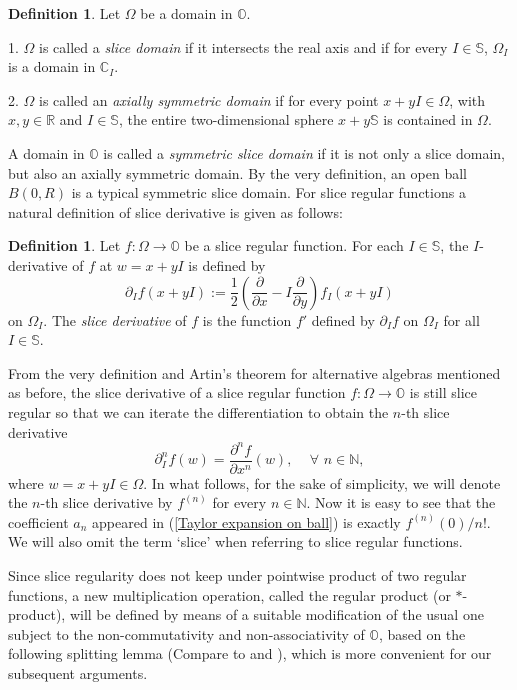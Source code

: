 \documentclass{amsart}
\theoremstyle{definition}
\newtheorem{definition}[theorem]{Definition}
\theoremstyle{remark}
\numberwithin{equation}{section}
\begin{document}
\begin{definition} \label{de: domain}
Let $\Omega$ be a domain in $\mathbb O $.

1. $\Omega$ is called a \textit{slice domain}  if it intersects the real axis and if  for every $I \in \mathbb S $, $\Omega_I$  is a domain in $ \mathbb C_I $.

2. $\Omega$ is called an \textit{axially symmetric domain} if for every point  $x + yI \in \Omega$, with  $x,y \in \mathbb R $ and $I\in \mathbb S$, the entire two-dimensional sphere $x + y\mathbb S$ is contained in $\Omega $.
\end{definition}

A domain in $\mathbb O$ is called a \textit{symmetric slice domain} if it is not only a slice domain, but also an axially symmetric domain. By the very definition, an open ball $B(0,R)$ is  a typical  symmetric slice domain.  For slice regular functions a natural definition of slice derivative is given as follows:
\begin{definition} \label{de: derivative}
Let $f :\Omega \rightarrow \mathbb O$  be a slice regular function. For each $I\in\mathbb S$, the $I$- derivative of $f$ at $w=x+yI$
is defined by
$$\partial_I f(x+yI):=\frac{1}{2}\left(\frac{\partial}{\partial x}-I\frac{\partial}{\partial y}\right)f_I (x+yI)$$
on $\Omega_I$. The \textit{slice derivative} of $f$ is the function $f'$ defined by $\partial_I f$ on $\Omega_I$ for all $I\in\mathbb S$.
 \end{definition}

From the very definition and  Artin's theorem for alternative algebras mentioned as before, the slice derivative of a slice regular function $f:\Omega \rightarrow \mathbb O$ is still slice regular so that we can iterate the differentiation to obtain the $n$-th
slice derivative
$$\partial^{n}_I f(w)=\frac{\partial^{n} f}{\partial x^{n}}(w),\quad\,\forall \,\, n\in \mathbb N,$$
where $w=x+yI\in \Omega$. In what follows, for the sake of simplicity, we will denote the $n$-th slice derivative by $f^{(n)}$ for every $n\in \mathbb N$.
Now it is easy to see that the coefficient $a_n$ appeared in (\ref{Taylor expansion on ball}) is exactly $f^{(n)}(0)/n!$. We will also omit the term `slice' when referring to slice regular functions.

Since  slice regularity does not keep under pointwise product of two regular functions, a new multiplication operation, called the regular product (or $\ast$-product), will be defined by means of a suitable modification of the usual one subject to the non-commutativity and non-associativity of $\mathbb O$, based on the following splitting lemma (Compare to \cite[Lemma 2.7]{GS50} and \cite[Lemma 2.4]{Ghiloni3}), which is more convenient for our subsequent arguments.
\end{document}
